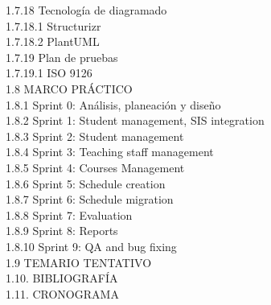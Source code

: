 1.7.18 Tecnología de diagramado\\
1.7.18.1 Structurizr\\
1.7.18.2 PlantUML\\
1.7.19 Plan de pruebas\\
1.7.19.1 ISO 9126\\
1.8 MARCO PRÁCTICO \\
1.8.1 Sprint 0: Análisis, planeación y diseño \\
1.8.2 Sprint 1: Student management, SIS integration \\
1.8.3 Sprint 2: Student management \\
1.8.4 Sprint 3: Teaching staff management \\
1.8.5 Sprint 4: Courses Management \\
1.8.6 Sprint 5: Schedule creation \\
1.8.7 Sprint 6: Schedule migration \\
1.8.8 Sprint 7: Evaluation \\
1.8.9 Sprint 8: Reports \\
1.8.10 Sprint 9: QA and bug fixing \\
1.9 TEMARIO TENTATIVO \\
1.10. BIBLIOGRAFÍA \\
1.11. CRONOGRAMA \\